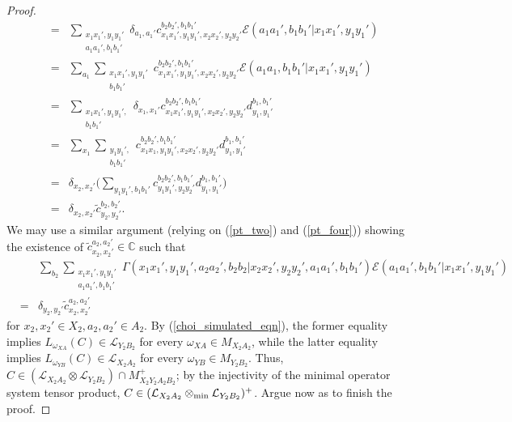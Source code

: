 \documentclass[11pt]{amsart}
\newcommand{\cl}[1]{\mathcal{#1}}
\newcommand{\bb}[1]{\mathbb{#1}}
\begin{document}
\begin{proof}
\begin{eqnarray*}
& = &
	\sum\limits_{\substack{x_{1}x_{1}', y_{1}y_{1}' \\ a_{1}a_{1}', b_{1}b_{1}'}}\delta_{a_{1}, a_{1}'}c_{x_{1}x_{1}', y_{1}y_{1}', x_{2}x_{2}', y_{2}y_{2}'}^{b_{2}b_{2}', b_{1}b_{1}'}\cl{E}(a_{1}a_{1}', b_{1}b_{1}'|x_{1}x_{1}', y_{1}y_{1}') \\
& = &
	\sum\limits_{a_{1}}\sum\limits_{\substack{x_{1}x_{1}', y_{1}y_{1}' \\ b_{1}b_{1}'}}c_{x_{1}x_{1}', y_{1}y_{1}', x_{2}x_{2}', y_{2}y_{2}'}^{b_{2}b_{2}', b_{1}b_{1}'}\cl{E}(a_{1}a_{1}, b_{1}b_{1}'|x_{1}x_{1}', y_{1}y_{1}') \\
& = &
	\sum\limits_{\substack{x_{1}x_{1}', y_{1}y_{1}', \\ b_{1}b_{1}'}}\delta_{x_{1}, x_{1}'}c_{x_{1}x_{1}', y_{1}y_{1}', x_{2}x_{2}', y_{2}y_{2}'}^{b_{2}b_{2}', b_{1}b_{1}'}d_{y_{1}, y_{1}'}^{b_{1}, b_{1}'} \\
& = &
	\sum\limits_{x_{1}}\sum\limits_{\substack{y_{1}y_{1}', \\ b_{1}b_{1}'}}c_{x_{1}x_{1}, y_{1}y_{1}', x_{2}x_{2}', y_{2}y_{2}'}^{b_{2}b_{2}', b_{1}b_{1}'}d_{y_{1}, y_{1}'}^{b_{1}, b_{1}'} \\
& = &
	\delta_{x_{2}, x_{2}'}\bigg(\sum\limits_{y_{1}y_{1}', b_{1}b_{1}'}c_{y_{1}y_{1}',  y_{2}y_{2}'}^{b_{2}b_{2}', b_{1}b_{1}'}d_{y_{1}, y_{1}'}^{b_{1}, b_{1}'}\bigg) \\
& = &
	\delta_{x_{2}, x_{2}'}\tilde{c}_{y_{2}, y_{2}'}^{b_{2}, b_{2}'}.
\end{eqnarray*}
\noindent We may use a similar argument (relying on (\ref{pt_two}) and (\ref{pt_four})) showing the existence of $\tilde{c}_{x_{2}, x_{2}'}^{a_{2}, a_{2}'} \in \bb{C}$ such that 
\begin{eqnarray*}
& &
	\sum\limits_{b_{2}}\sum\limits_{\substack{ x_{1}x_{1}', y_{1}y_{1}' \\ a_{1}a_{1}', b_{1}b_{1}'}}\Gamma(x_{1}x_{1}', y_{1}y_{1}', a_{2}a_{2}', b_{2}b_{2}|x_{2}x_{2}', y_{2}y_{2}', a_{1}a_{1}', b_{1}b_{1}')\cl{E}(a_{1}a_{1}', b_{1}b_{1}'|x_{1}x_{1}', y_{1}y_{1}') \\
& = &
	\delta_{y_{2}, y_{2}'}\tilde{c}_{x_{2}, x_{2}'}^{a_{2}, a_{2}'}
\end{eqnarray*}
\noindent for $x_{2}, x_{2}' \in X_{2}, a_{2}, a_{2}' \in A_{2}$. By (\ref{choi_simulated_eqn}), the former equality implies $L_{\omega_{XA}}(C) \in \cl{L}_{Y_{2}B_{2}}$ for every $\omega_{XA} \in M_{X_{2}A_{2}}$, while the latter equality implies $L_{\omega_{YB}}(C) \in \cl{L}_{X_{2}A_{2}}$ for every $\omega_{YB} \in M_{Y_{2}B_{2}}$. Thus, $C \in (\cl{L}_{X_{2}A_{2}}\otimes \cl{L}_{Y_{2}B_{2}}) \cap M_{X_{2}Y_{2}A_{2}B_{2}}^{+}$; by the injectivity of the minimal operator system tensor product, $C \in (\cl{L}_{X_{2}A_{2}}\otimes_{\rm min} \cl{L}_{Y_{2}B_{2}})^{+}$. Argue now as \cite[Theorem 6.2]{tt} to finish the proof.


\end{proof}
\end{document}
